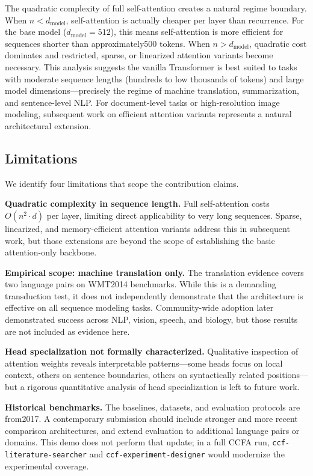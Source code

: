 ﻿\documentclass{article}
\begin{document}
The quadratic complexity of full self-attention creates a natural regime boundary. When $n < d_{\text{model}}$, self-attention is actually cheaper per layer than recurrence. For the base model ($d_{\text{model}}=512$), this means self-attention is more efficient for sequences shorter than approximately500 tokens. When $n > d_{\text{model}}$, quadratic cost dominates and restricted, sparse, or linearized attention variants become necessary. This analysis suggests the vanilla Transformer is best suited to tasks with moderate sequence lengths (hundreds to low thousands of tokens) and large model dimensions---precisely the regime of machine translation, summarization, and sentence-level NLP. For document-level tasks or high-resolution image modeling, subsequent work on efficient attention variants represents a natural architectural extension.

\subsection{Limitations}

We identify four limitations that scope the contribution claims.

\textbf{Quadratic complexity in sequence length.} Full self-attention costs $O(n^2 \cdot d)$ per layer, limiting direct applicability to very long sequences. Sparse, linearized, and memory-efficient attention variants address this in subsequent work, but those extensions are beyond the scope of establishing the basic attention-only backbone.

\textbf{Empirical scope: machine translation only.} The translation evidence covers two language pairs on WMT2014 benchmarks. While this is a demanding transduction test, it does not independently demonstrate that the architecture is effective on all sequence modeling tasks. Community-wide adoption later demonstrated success across NLP, vision, speech, and biology, but those results are not included as evidence here.

\textbf{Head specialization not formally characterized.} Qualitative inspection of attention weights reveals interpretable patterns---some heads focus on local context, others on sentence boundaries, others on syntactically related positions---but a rigorous quantitative analysis of head specialization is left to future work.

\textbf{Historical benchmarks.} The baselines, datasets, and evaluation protocols are from2017. A contemporary submission should include stronger and more recent comparison architectures, and extend evaluation to additional language pairs or domains. This demo does not perform that update; in a full CCFA run, \texttt{ccf-literature-searcher} and \texttt{ccf-experiment-designer} would modernize the experimental coverage.
\end{document}

